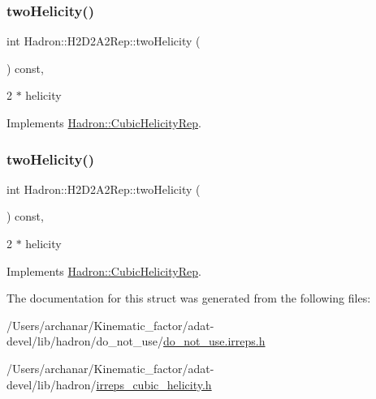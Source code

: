 \subsubsection{\texorpdfstring{twoHelicity()}{twoHelicity()}\hspace{0.1cm}{\footnotesize\ttfamily [2/3]}}
{\footnotesize\ttfamily int Hadron\+::\+H2\+D2\+A2\+Rep\+::two\+Helicity (\begin{DoxyParamCaption}{ }\end{DoxyParamCaption}) const\hspace{0.3cm}{\ttfamily [inline]}, {\ttfamily [virtual]}}

2 $\ast$ helicity 

Implements \mbox{\hyperlink{structHadron_1_1CubicHelicityRep_af507aa56fc2747eacc8cb6c96db31ecc}{Hadron\+::\+Cubic\+Helicity\+Rep}}.

\mbox{\label{structHadron_1_1H2D2A2Rep_a37671b4331422027fe047d7e50288c54}} 
\subsubsection{\texorpdfstring{twoHelicity()}{twoHelicity()}\hspace{0.1cm}{\footnotesize\ttfamily [3/3]}}
{\footnotesize\ttfamily int Hadron\+::\+H2\+D2\+A2\+Rep\+::two\+Helicity (\begin{DoxyParamCaption}{ }\end{DoxyParamCaption}) const\hspace{0.3cm}{\ttfamily [inline]}, {\ttfamily [virtual]}}

2 $\ast$ helicity 

Implements \mbox{\hyperlink{structHadron_1_1CubicHelicityRep_af507aa56fc2747eacc8cb6c96db31ecc}{Hadron\+::\+Cubic\+Helicity\+Rep}}.



The documentation for this struct was generated from the following files\+:\begin{DoxyCompactItemize}
\item 
/\+Users/archanar/\+Kinematic\+\_\+factor/adat-\/devel/lib/hadron/do\+\_\+not\+\_\+use/\mbox{\hyperlink{adat-devel_2lib_2hadron_2do__not__use_2do__not__use_8irreps_8h}{do\+\_\+not\+\_\+use.\+irreps.\+h}}\item 
/\+Users/archanar/\+Kinematic\+\_\+factor/adat-\/devel/lib/hadron/\mbox{\hyperlink{adat-devel_2lib_2hadron_2irreps__cubic__helicity_8h}{irreps\+\_\+cubic\+\_\+helicity.\+h}}\end{DoxyCompactItemize}
